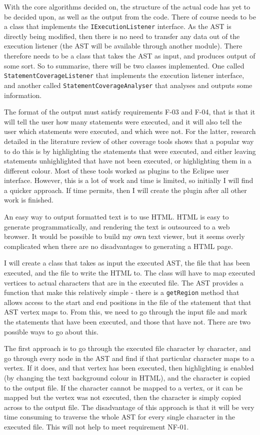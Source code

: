 With the core algorithms decided on, the structure of the actual code has yet to be decided upon, as well as the output from the code. There of course needs to be a class that implements the \verb|IExecutionListener| interface. As the AST is directly being modified, then there is no need to transfer any data out of the execution listener (the AST will be available through another module). There therefore needs to be a class that takes the AST as input, and produces output of some sort. So to summarise, there will be two classes implemented. One called \verb|StatementCoverageListener| that implements the execution listener interface, and another called \verb|StatementCoverageAnalyser| that analyses and outputs some information.

The format of the output must satisfy requirements F-03 and F-04, that is that it will tell the user how many statements were executed, and it will also tell the user which statements were executed, and which were not. For the latter, research detailed in the literature review of other coverage tools shows that a popular way to do this is by highlighting the statements that were executed, and either leaving statements unhighlighted that have not been executed, or highlighting them in a different colour. Most of these tools worked as plugins to the Eclipse user interface. However, this is a lot of work and time is limited, so initially I will find a quicker approach. If time permits, then I will create the plugin after all other work is finished.

An easy way to output formatted text is to use HTML. HTML is easy to generate programmatically, and rendering the text is outsourced to a web browser. It would be possible to build my own text viewer, but it seems overly complicated when there are no disadvantages to generating a HTML page.

I will create a class that takes as input the executed AST, the file that has been executed, and the file to write the HTML to. The class will have to map executed vertices to actual characters that are in the executed file. The AST provides a function that make this relatively simple - there is a \verb|getRegion| method that allows access to the start and end positions in the file of the statement that that AST vertex maps to. From this, we need to go through the input file and mark the statements that have been executed, and those that have not. There are two possible ways to go about this. 

The first approach is to go through the executed file character by character, and go through every node in the AST and find if that particular character maps to a vertex. If it does, and that vertex has been executed, then highlighting is enabled (by changing the text background colour in HTML), and the character is copied to the output file. If the character cannot be mapped to a vertex, or it can be mapped but the vertex was not executed, then the character is simply copied across to the output file. The disadvantage of this approach is that it will be very time consuming to traverse the whole AST for every single character in the executed file. This will not help to meet requirement NF-01.


